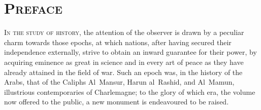 \thispagestyle{empty}
\null\clearpage

\section*{\textsc{Preface}}

\lettrine{I}{n the study of history,} the attention of the observer is drawn by a peculiar charm towards those epochs, at which nations, after having secured their independence externally, strive to obtain an inward guarantee for their power, by acquiring eminence as great in science and in every art of peace as they have already attained in the field of war. Such an epoch was, in the history of the Arabs, that of the Caliphs Al~Mansur, Harun al~Rashid, and Al~Mamun, illustrious contemporaries of Charlemagne; to the glory of which era, the volume now offered to the public, a new monument is endeavoured to be raised.

